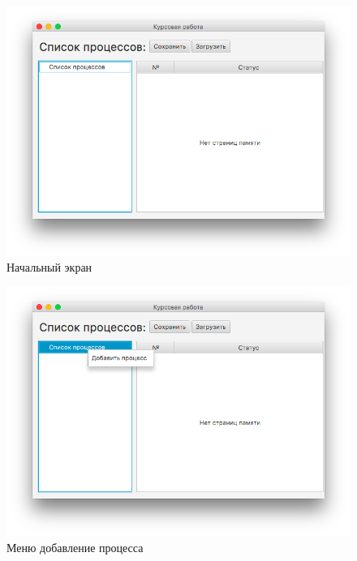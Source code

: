 \documentclass[russian,utf8,simple,hpadding=10mm,vpadding=20mm]{eskdtext}
\begin{document}
\begin{figure}[!hb]
    \centering
    \includegraphics[width=1\textwidth]{screenshots/1.png}
    \caption{Начальный экран}
    \label{fig:mesh1}
\end{figure}
\begin{figure}[!h]
    \centering
    \includegraphics[width=1\textwidth]{screenshots/2.png}
    \caption{Меню добавление процесса}
    \label{fig:mesh2}
\end{figure}
\end{document}
